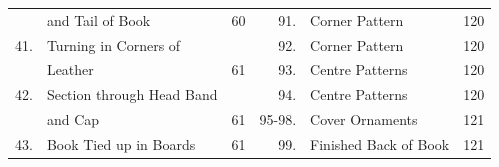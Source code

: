 \documentclass[twoside]{book}
\begin{document}
\begin{tiny}
\begin{tabular}{r l r r l r }
       & and Tail of Book          \dotfill & 60     &    91. & Corner Pattern              \dotfill & 120 \\ 
41.    & Turning in Corners of              &        &    92. & Corner Pattern              \dotfill & 120 \\ 
       & Leather                   \dotfill & 61     &    93. & Centre Patterns             \dotfill & 120 \\ 
42.    & Section through Head Band          &        &    94. & Centre Patterns             \dotfill & 120 \\ 
       & and Cap                   \dotfill & 61     & 95-98. & Cover Ornaments             \dotfill & 121 \\ 
43.    & Book Tied up in Boards    \dotfill & 61     &    99. & Finished Back of Book       \dotfill & 121 \\ 

\end{tabular}

\pagebreak

\begin{tabular}{r l r r l r }


\end{tabular}
\end{tiny}
\end{document}
